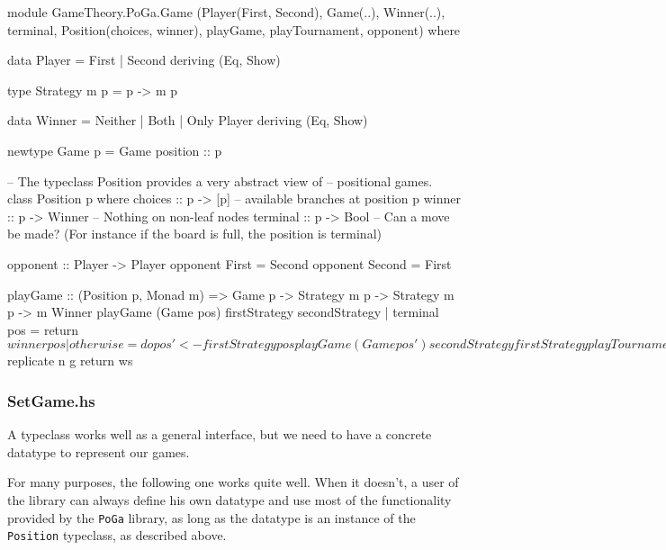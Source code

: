 \begin{code}
module GameTheory.PoGa.Game
       (Player(First, Second),
        Game(..),
        Winner(..),
        terminal,
        Position(choices, winner),
        playGame,
        playTournament,
        opponent)
        where

data Player = First | Second
  deriving (Eq, Show)
           
type Strategy m p = p -> m p

data Winner = Neither | Both | Only Player
  deriving (Eq, Show)


newtype Game p = Game {position :: p}


-- The typeclass Position provides a very abstract view of
-- positional games.
class Position p where
  choices :: p -> [p]     -- available branches at position p
  winner :: p -> Winner   -- Nothing on non-leaf nodes
  terminal :: p -> Bool   -- Can a move be made? (For instance if the board is full,
                                                  the position is terminal)

opponent :: Player -> Player
opponent First = Second
opponent Second = First


playGame :: (Position p, Monad m) =>
  Game p -> Strategy m p -> Strategy m p -> m Winner
playGame (Game pos) firstStrategy secondStrategy
  | terminal pos = return $ winner pos
  | otherwise = do
      pos' <- firstStrategy pos
      playGame (Game pos') secondStrategy firstStrategy
      
playTournament :: (Monad m, Position p) =>
  Int -> Game p -> Strategy m p -> Strategy m p -> m [Winner]
playTournament n game fststrat sndstrat = do
  let g = playGame game fststrat sndstrat
  ws <- sequence $ replicate n g
  return ws
\end{code}

\subsubsection{SetGame.hs}

A typeclass works well as a general interface, but we need to have a concrete datatype to represent our games.

For many purposes, the following one works quite well. When it doesn't, a user of the library can always define his own datatype and use most of the functionality provided by the \texttt{PoGa} library, as long as the datatype is an instance of the \texttt{Position} typeclass, as described above.

